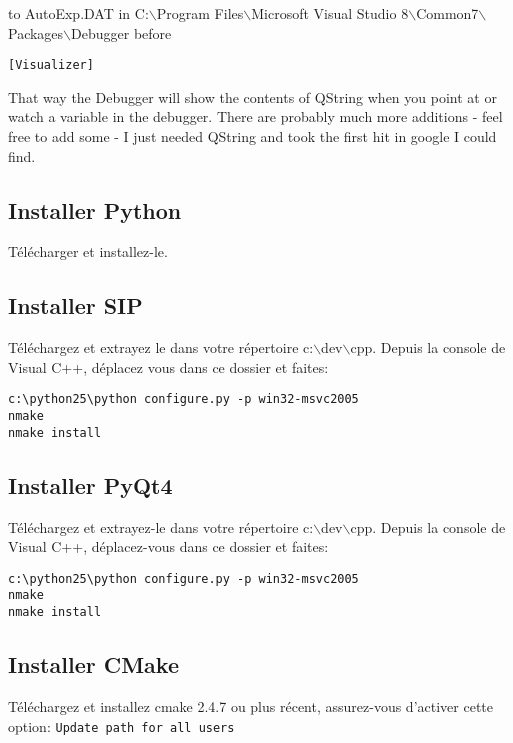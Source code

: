 to AutoExp.DAT in C:$\backslash$Program Files$\backslash$Microsoft Visual Studio
8$\backslash$Common7$\backslash$Packages$\backslash$Debugger before 

\begin{verbatim}
[Visualizer]
\end{verbatim}

That way the Debugger will show the contents of QString when you point at or
watch a variable in the debugger.  There are probably much more additions -
feel free to add some - I just needed QString and took the first hit in google
I could find.

\subsection{Installer Python}
T\'el\'echarger  et installez-le.

\subsection{Installer SIP}
T\'el\'echargez et extrayez le dans votre r\'epertoire c:$\backslash$dev$\backslash$cpp.
Depuis la console de Visual C++, d\'eplacez vous dans ce dossier et faites:

\begin{verbatim}
c:\python25\python configure.py -p win32-msvc2005
nmake
nmake install
\end{verbatim}

\subsection{Installer PyQt4}
T\'el\'echargez  et extrayez-le dans votre r\'epertoire c:$\backslash$dev$\backslash$cpp.
Depuis la console de Visual C++, d\'eplacez-vous dans ce dossier et faites:

\begin{verbatim}
c:\python25\python configure.py -p win32-msvc2005
nmake
nmake install
\end{verbatim}

\subsection{Installer CMake}
T\'el\'echargez et installez cmake 2.4.7 ou plus r\'ecent, assurez-vous d'activer cette option:
\texttt{Update path for all users}

